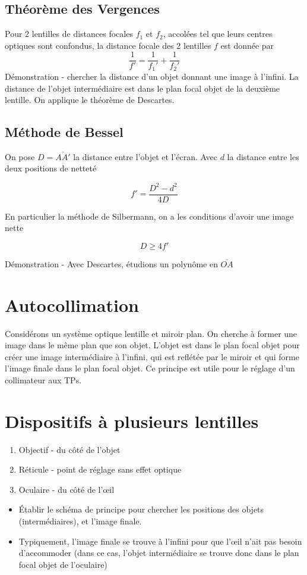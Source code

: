\documentclass[openany]{book}
\begin{document}
\subsection{Théorème des Vergences}
Pour 2 lentilles de distances focales $f_1$ et $f_2$, accolées tel que leurs centres optiques sont confondus, la distance focale des 2 lentilles $f$ est donnée par 
\[ \frac{1}{f'} = \frac{1}{f_1'} + \frac{1}{f_2'} \]
Démonstration - chercher la distance d'un objet donnant une image à l'infini. La distance de l'objet intermédiaire est dans le plan focal objet de la deuxième lentille. On applique le théorème de Descartes. 

\subsection{Méthode de Bessel}
On pose $ D = \overline{AA'} $ la distance entre l'objet et l'écran. Avec $d$ la distance entre les deux positions de netteté

\[ f' = \frac{D^2 - d^2}{4D} \]

En particulier la méthode de Silbermann, on a les conditions d'avoir une image nette

\[ D \geq 4f' \]

Démonstration - Avec Descartes, étudions un polynôme en $\overline{OA}$

\section{Autocollimation}
Considérons un système optique lentille et miroir plan. On cherche à former une image dans le même plan que son objet. L'objet est dans le plan focal objet pour créer une image intermédiaire à l'infini, qui est reflétée par le miroir et qui forme l'image finale dans le plan focal objet. Ce principe est utile pour le réglage d'un collimateur aux TPs. 

\section{Dispositifs à plusieurs lentilles}
\begin{enumerate}
    \item Objectif - du côté de l'objet
    \item Réticule - point de réglage sans effet optique
    \item Oculaire - du côté de l'œil
\end{enumerate}

\begin{itemize}
    \item Établir le schéma de principe pour chercher les positions des objets (intermédiaires), et l'image finale.
    \item Typiquement, l'image finale se trouve à l'infini pour que l'œil n'ait pas besoin d'accommoder (dans ce cas, l'objet intermédiaire se trouve donc dans le plan focal objet de l'oculaire)
\end{itemize}
\end{document}
